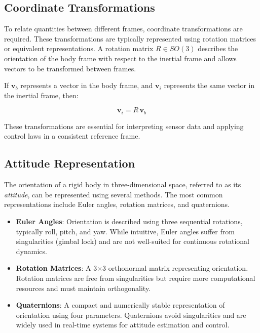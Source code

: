 \subsection{Coordinate Transformations}

To relate quantities between different frames, coordinate transformations are required. These transformations are typically represented using rotation matrices or equivalent representations. A rotation matrix \( R \in SO(3) \) describes the orientation of the body frame with respect to the inertial frame and allows vectors to be transformed between frames.

If \( \mathbf{v}_b \) represents a vector in the body frame, and \( \mathbf{v}_i \) represents the same vector in the inertial frame, then:

\[
\mathbf{v}_i = R \, \mathbf{v}_b
\]

These transformations are essential for interpreting sensor data and applying control laws in a consistent reference frame.

\subsection{Attitude Representation}

The orientation of a rigid body in three-dimensional space, referred to as its \textit{attitude}, can be represented using several methods. The most common representations include Euler angles, rotation matrices, and quaternions.

\begin{itemize}
    \item \textbf{Euler Angles}:  
    Orientation is described using three sequential rotations, typically roll, pitch, and yaw. While intuitive, Euler angles suffer from singularities (gimbal lock) and are not well-suited for continuous rotational dynamics.

    \item \textbf{Rotation Matrices}:  
    A 3×3 orthonormal matrix representing orientation. Rotation matrices are free from singularities but require more computational resources and must maintain orthogonality.

    \item \textbf{Quaternions}:  
    A compact and numerically stable representation of orientation using four parameters. Quaternions avoid singularities and are widely used in real-time systems for attitude estimation and control.
\end{itemize}

